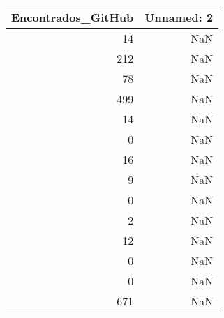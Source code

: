\begin{tabular}{rr}
\toprule
 Encontrados\_GitHub &  Unnamed: 2 \\
\midrule
                 14 &         NaN \\
                212 &         NaN \\
                 78 &         NaN \\
                499 &         NaN \\
                 14 &         NaN \\
                  0 &         NaN \\
                 16 &         NaN \\
                  9 &         NaN \\
                  0 &         NaN \\
                  2 &         NaN \\
                 12 &         NaN \\
                  0 &         NaN \\
                  0 &         NaN \\
                671 &         NaN \\
\bottomrule
\end{tabular}
